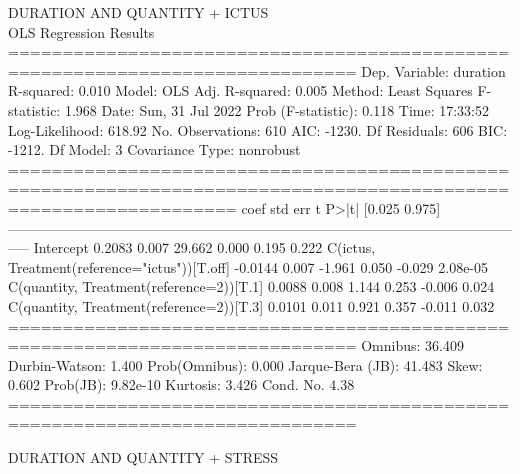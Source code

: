 DURATION AND QUANTITY + ICTUS\\
OLS Regression Results       \\                     
==============================================================================
Dep. Variable:               duration   R-squared:                       0.010
Model:                            OLS   Adj. R-squared:                  0.005
Method:                 Least Squares   F-statistic:                     1.968
Date:                Sun, 31 Jul 2022   Prob (F-statistic):              0.118
Time:                        17:33:52   Log-Likelihood:                 618.92
No. Observations:                 610   AIC:                            -1230.
Df Residuals:                     606   BIC:                            -1212.
Df Model:                           3                                         
Covariance Type:            nonrobust                                         
=================================================================================================================
                                                    coef    std err          t      P>|t|      [0.025      0.975]
-----------------------------------------------------------------------------------------------------------------
Intercept                                         0.2083      0.007     29.662      0.000       0.195       0.222
C(ictus, Treatment(reference="ictus"))[T.off]    -0.0144      0.007     -1.961      0.050      -0.029    2.08e-05
C(quantity, Treatment(reference=2))[T.1]          0.0088      0.008      1.144      0.253      -0.006       0.024
C(quantity, Treatment(reference=2))[T.3]          0.0101      0.011      0.921      0.357      -0.011       0.032
==============================================================================
Omnibus:                       36.409   Durbin-Watson:                   1.400
Prob(Omnibus):                  0.000   Jarque-Bera (JB):               41.483
Skew:                           0.602   Prob(JB):                     9.82e-10
Kurtosis:                       3.426   Cond. No.                         4.38
==============================================================================

DURATION AND QUANTITY + STRESS \\

